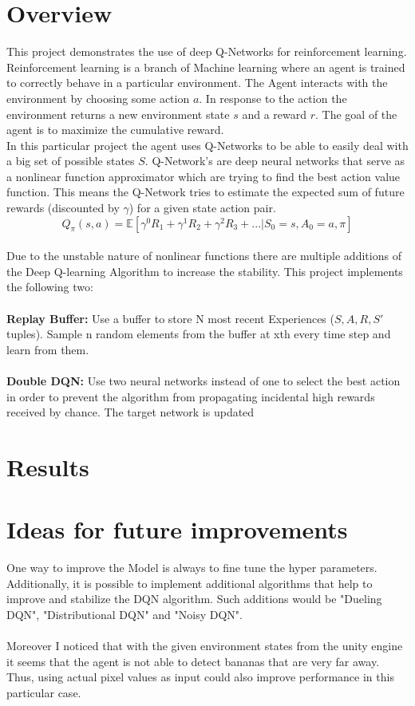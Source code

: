 \documentclass[12pt,a4paper]{article}
\begin{document}
    \section{Overview}\label{sec:overview}
    This project demonstrates the use of deep Q-Networks for reinforcement learning.
    Reinforcement learning is a branch of Machine learning where an agent is trained to correctly behave in
    a particular environment.
    The Agent interacts with the environment by choosing some action $a$.
    In response to the action the environment returns a new environment state $s$ and a reward $r$.
    The goal of the agent is to maximize the cumulative reward.
    \\
    In this particular project the agent uses Q-Networks to be able to easily deal with a big set of possible states $S$.
    Q-Network's are deep neural networks that serve as a nonlinear function approximator which are trying to find the best action value function.
    This means the Q-Network tries to estimate the expected sum of future rewards (discounted by $\gamma$) for a given state action pair.
    $$Q_{\pi}(s,a)=\mathbb{E}[\gamma ^{0}R_{1}+\gamma ^{1}R_{2}+\gamma ^{2}R_{3}+...|S_{0}=s, A_{0}=a, \pi]$$
    \\
    Due to the unstable nature of nonlinear functions there are multiple additions of the Deep Q-learning Algorithm to increase the stability.
    This project implements the following two:
    \\\\
    \textbf{Replay Buffer:}
    Use a buffer to store N most recent Experiences ($S, A, R, S'$ tuples).
    Sample n random elements from the buffer at xth every time step and learn from them.
    \\\\
    \textbf{Double DQN:}
    Use two neural networks instead of one to select the best action in order to prevent the algorithm from propagating incidental high rewards received by chance.
    The target network is updated


    \section{Results}\label{sec:results}


    \section{Ideas for future improvements}\label{sec:ideas}
    One way to improve the Model is always to fine tune the hyper parameters.
    Additionally, it is possible to implement additional algorithms that help to improve and stabilize the DQN algorithm.
    Such additions would be "Dueling DQN", "Distributional DQN" and "Noisy DQN".
    \\\\
    Moreover I noticed that with the given environment states from the unity engine it seems that the agent is not able
    to detect bananas that are very far away.
    Thus, using actual pixel values as input could also improve performance in this particular case.
\end{document}

